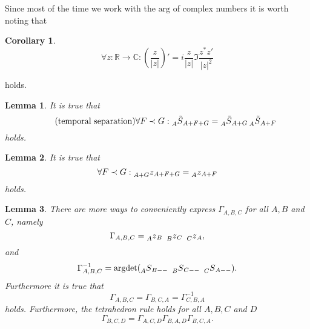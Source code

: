 \documentclass[oneside,reqno,12pt]{amsart}
\newtheorem{lemma}{Lemma}
\newtheorem{Corollary}[Def]{Corollary}
\begin{document}
Since most of the time we work with the \(\text{arg}\) of complex numbers it is worth noting that
\begin{Corollary}\label{corollary:phase'}
\begin{equation}
\forall z:\mathbb{R}\rightarrow \mathbb{C}: \left( \frac{z}{|z|}\right)'=  i \frac{z}{|z|} \Im \frac{ z^* z'}{|z|^2}
\end{equation}
\end{Corollary}
holds. 


\begin{lemma}\label{lemma:temp_sep}
It is true that
\begin{equation}\label{temp_sep}\tag{temporal separation}
\forall F\prec G: \prescript{}{A}{\tilde{S}}_{A+F+G}=\prescript{}{A}{\tilde{S}}_{A+G}\prescript{}{A}{\tilde{S}}_{A+F}
\end{equation}
holds.
\end{lemma}

\begin{lemma}\label{lemma:z_temp_sep}
It is true that
\begin{equation}\label{z_temp_sep}
\forall F\prec G: \prescript{}{A+G}{z}_{A+F+G}=\prescript{}{A}{z}_{A+F}
\end{equation}
holds.
\end{lemma}

\begin{lemma}\label{lemma:gamma}
There are more ways to conveniently express \(\Gamma_{A,B,C}\) for all \(A,B\) and \(C\), namely
\begin{equation}\label{gamma_to_z}
\Gamma_{A,B,C}=\prescript{}{A}{z}_{B} ~\prescript{}{B}{z}_{C}~\prescript{}{C}{z}_A,
\end{equation}
and
\begin{equation}\label{gamma_by_argdet}
\Gamma^{-1}_{A,B,C}= \text{argdet}(\prescript{}{A}{S}_{B --} ~ \prescript{}{B}{S}_{C --} ~\prescript{}{C}{S}_{A --}).
\end{equation}
Furthermore it is true that
\begin{equation}\label{gamma_cycle}
\Gamma_{A,B,C}=\Gamma_{B,C,A}=\Gamma^{-1}_{C,B,A}
\end{equation}
holds. Furthermore, the tetrahedron rule holds for all \(A,B,C\) and \(D\)
\begin{equation}\label{gamma_tetrahedron}
\Gamma_{B,C,D}=\Gamma_{A,C,D}\Gamma_{B,A,D} \Gamma_{B,C,A}.
\end{equation}

\end{lemma}
\end{document}
